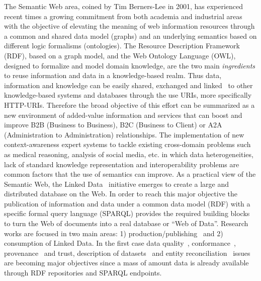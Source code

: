 The Semantic Web area, coined by Tim Berners-Lee in 2001, has experienced recent times a growing 
commitment from both academia and industrial areas  with the objective of elevating the meaning of web 
information resources through a common and shared data model (graphs) and an underlying semantics based 
on different logic formalisms (ontologies). The Resource Description Framework (RDF), based on a graph model, and the Web Ontology Language (OWL), 
designed to formalize and model domain knowledge, are the two main \textit{ingredients} to reuse information and data 
in a knowledge-based realm. Thus data, information and knowledge can be easily shared, exchanged and linked~\cite{Maali_Cyganiak_2011} 
to other knowledge-based systems and databases through the use URIs, more specifically HTTP-URIs. Therefore the broad objective of this effort can be summarized 
as a new environment of added-value information and services that can boost and improve B2B (Business to Business), B2C (Business to Client) or 
A2A (Administration to Administration) relationships. The implementation of new context-awareness expert systems to tackle existing 
cross-domain problems such as medical reasoning, analysis of social media, etc. in which data heterogeneities, 
lack of standard knowledge representation and interoperability problems are common factors that the use of semantics can improve. As a practical view of the Semantic Web, 
the Linked Data~\cite{Heath_Bizer_2011} initiative emerges to create a large and distributed database on the Web. 
In order to reach this major objective the publication of information and data under a common data model (RDF) 
with a specific formal query language (SPARQL) provides the required building blocks to turn the Web of documents 
into a real database or ``Web of Data''. Research works are focused in two main areas: 1) production/publishing~\cite{bizer07how} and 2) consumption of 
Linked Data. In the first case data quality~\cite{Bizer2009QA}, conformance~\cite{DBLP:journals/ws/HoganUHCPD12}, 
provenance~\cite{w3c-prov,DBLP:conf/ipaw/HartigZ10} and trust, description of datasets~\cite{void,Cyganiak08semanticsitemaps} and 
entity reconciliation~\cite{Maali_Cyganiak_2011} issues are becoming major objectives since a mass of amount data is already available through RDF repositories and SPARQL endpoints. 


